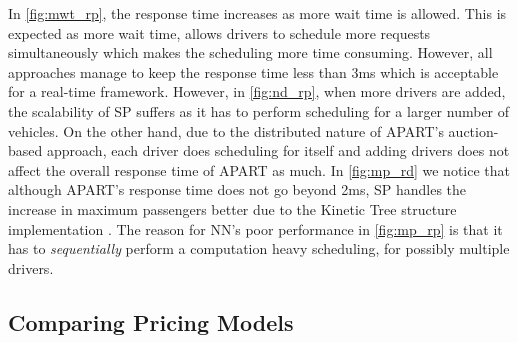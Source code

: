 In \cref{fig:mwt_rp}, the response time increases as more wait time is allowed. This is expected as more wait time, allows drivers to schedule more requests simultaneously which makes the scheduling more time consuming. However, all approaches manage to keep the response time less than 3ms which is acceptable for a real-time framework. However, in \cref{fig:nd_rp}, when more drivers are added, the scalability of SP suffers as it has to perform scheduling for a larger number of vehicles. On the other hand, due to the distributed nature of APART's auction-based approach, each driver does scheduling for itself and adding drivers does not affect the overall response time of APART as much. In \cref{fig:mp_rd} we notice that although APART's response time does not go beyond 2ms, SP handles the increase in maximum passengers better due to the Kinetic Tree structure implementation \cite{Huang14}. The reason for NN's poor performance in \cref{fig:mp_rp} is that it has to \textit{sequentially} perform a computation heavy scheduling, for possibly multiple drivers.

\subsection{Comparing Pricing Models}
\label{subsec:pricingexp}

